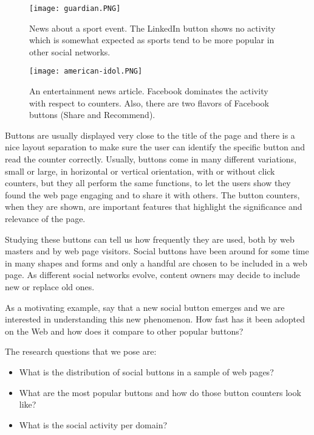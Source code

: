 \documentclass{sig-alternate}
\begin{document}
\begin{figure}[h]
\centering
\texttt{[image: guardian.PNG]}
\caption{News about a sport event. The LinkedIn button shows no activity which is somewhat expected as sports tend to be more popular in other
social networks.}
\label{fig:techcrunch}
\end{figure}

\begin{figure}[h]
\centering
\texttt{[image: american-idol.PNG]}
\caption{An entertainment news article. Facebook dominates the activity with respect to counters. Also, there are two flavors of Facebook buttons
(Share and Recommend).  }
\label{fig:american-idol}
\end{figure}

Buttons are usually displayed very close to the title of the page and there is a nice layout separation to make sure the user can identify the specific 
button and read the counter correctly. Usually, buttons come in many different variations, small or large, in horizontal or vertical orientation, with or without click counters, but they all perform the same functions, to let the users show they found the web page engaging and to share it with others. The button counters, when they are shown, are important features that highlight the significance and relevance of the page. 

Studying these buttons can tell us how frequently they are used, both by web masters and by web page visitors. 
Social buttons have been around for some time in many shapes and forms and only a handful are chosen to be included in a web page. As different
social networks evolve, content owners may decide to include new or replace old ones. 

As a motivating example, say that a new social button emerges and we are interested in understanding this new phenomenon. How fast has it been adopted on the Web and how does it compare to other popular buttons?

The research questions that we pose are:

\begin{itemize}
\item	What is the distribution of social buttons in a sample of web pages?
\item	What are the most popular buttons and how do those button counters look like? 
\item	What is the social activity per domain?
\end{itemize}
\end{document}
